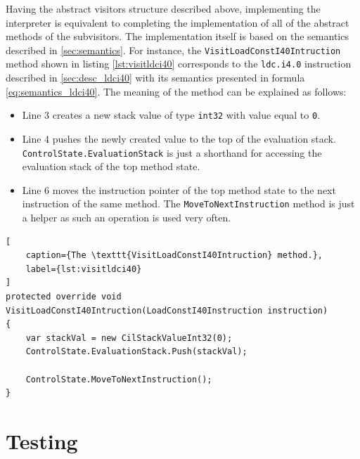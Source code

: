 \documentclass[declaration,shortabstract,english,mgr]{iithesis}
\begin{document}
Having the abstract visitors structure described above, implementing the interpreter is equivalent to completing the implementation of all of the abstract methods of the subvisitors. The implementation itself is based on the semantics described in \ref{sec:semantics}. For instance, the \texttt{VisitLoadConstI40Intruction} method shown in listing \ref{lst:visitldci40} corresponds to the \texttt{ldc.i4.0} instruction described in \ref{sec:desc_ldci40} with its semantics presented in formula \ref{eq:semantics_ldci40}. The meaning of the method can be explained as follows:
\begin{itemize}
	\item{Line 3 creates a new stack value of type \texttt{int32} with value equal to \texttt{0}.}
	\item{Line 4 pushes the newly created value to the top of the evaluation stack. \texttt{ControlState.EvaluationStack} is just a shorthand for accessing the evaluation stack of the top method state.}
	\item{Line 6 moves the instruction pointer of the top method state to the next instruction of the same method. The \texttt{MoveToNextInstruction} method is just a helper as such an operation is used very often.}
\end{itemize}

\begin{lstlisting}[
	caption={The \texttt{VisitLoadConstI40Intruction} method.},
	label={lst:visitldci40}
]
protected override void VisitLoadConstI40Intruction(LoadConstI40Instruction instruction)
{
	var stackVal = new CilStackValueInt32(0);
	ControlState.EvaluationStack.Push(stackVal);

	ControlState.MoveToNextInstruction();
}
\end{lstlisting}

\clearpage


\chapter{Testing}
\label{sec:testing}
\end{document}
